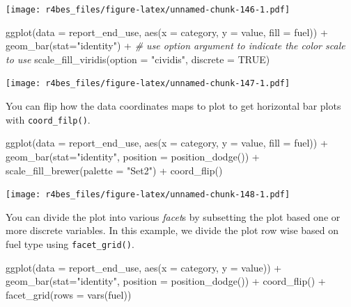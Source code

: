 \documentclass[
]{book}
\newenvironment{Shaded}{\begin{snugshade}}{\end{snugshade}}
\newcommand{\AttributeTok}[1]{\textcolor[rgb]{0.77,0.63,0.00}{#1}}
\newcommand{\CommentTok}[1]{\textcolor[rgb]{0.56,0.35,0.01}{\textit{#1}}}
\newcommand{\ConstantTok}[1]{\textcolor[rgb]{0.00,0.00,0.00}{#1}}
\newcommand{\FunctionTok}[1]{\textcolor[rgb]{0.00,0.00,0.00}{#1}}
\newcommand{\NormalTok}[1]{#1}
\newcommand{\SpecialCharTok}[1]{\textcolor[rgb]{0.00,0.00,0.00}{#1}}
\newcommand{\StringTok}[1]{\textcolor[rgb]{0.31,0.60,0.02}{#1}}
\begin{document}
\texttt{[image: r4bes\_files/figure-latex/unnamed-chunk-146-1.pdf]}

\begin{Shaded}
\begin{Highlighting}[]
\FunctionTok{ggplot}\NormalTok{(}\AttributeTok{data =}\NormalTok{ report\_end\_use, }\FunctionTok{aes}\NormalTok{(}\AttributeTok{x =}\NormalTok{ category, }\AttributeTok{y =}\NormalTok{ value, }\AttributeTok{fill =}\NormalTok{ fuel)) }\SpecialCharTok{+}
    \FunctionTok{geom\_bar}\NormalTok{(}\AttributeTok{stat=}\StringTok{"identity"}\NormalTok{) }\SpecialCharTok{+} 
    \CommentTok{\# use option argument to indicate the color scale to use}
    \FunctionTok{scale\_fill\_viridis}\NormalTok{(}\AttributeTok{option =} \StringTok{"cividis"}\NormalTok{,}
                       \AttributeTok{discrete =} \ConstantTok{TRUE}\NormalTok{) }
\end{Highlighting}
\end{Shaded}

\texttt{[image: r4bes\_files/figure-latex/unnamed-chunk-147-1.pdf]}

You can flip how the data coordinates maps to plot to get horizontal bar plots with \texttt{coord\_filp()}.

\begin{Shaded}
\begin{Highlighting}[]
\FunctionTok{ggplot}\NormalTok{(}\AttributeTok{data =}\NormalTok{ report\_end\_use, }\FunctionTok{aes}\NormalTok{(}\AttributeTok{x =}\NormalTok{ category, }\AttributeTok{y =}\NormalTok{ value, }\AttributeTok{fill =}\NormalTok{ fuel)) }\SpecialCharTok{+}
    \FunctionTok{geom\_bar}\NormalTok{(}\AttributeTok{stat=}\StringTok{"identity"}\NormalTok{, }\AttributeTok{position =} \FunctionTok{position\_dodge}\NormalTok{()) }\SpecialCharTok{+} 
    \FunctionTok{scale\_fill\_brewer}\NormalTok{(}\AttributeTok{palette =} \StringTok{"Set2"}\NormalTok{) }\SpecialCharTok{+}
    \FunctionTok{coord\_flip}\NormalTok{()}
\end{Highlighting}
\end{Shaded}

\texttt{[image: r4bes\_files/figure-latex/unnamed-chunk-148-1.pdf]}

You can divide the plot into various \emph{facet}s by subsetting the plot based one or more discrete variables. In this example, we divide the plot row wise based on fuel type using \texttt{facet\_grid()}.

\begin{Shaded}
\begin{Highlighting}[]
\FunctionTok{ggplot}\NormalTok{(}\AttributeTok{data =}\NormalTok{ report\_end\_use, }\FunctionTok{aes}\NormalTok{(}\AttributeTok{x =}\NormalTok{ category, }\AttributeTok{y =}\NormalTok{ value)) }\SpecialCharTok{+}
    \FunctionTok{geom\_bar}\NormalTok{(}\AttributeTok{stat=}\StringTok{"identity"}\NormalTok{, }\AttributeTok{position =} \FunctionTok{position\_dodge}\NormalTok{()) }\SpecialCharTok{+} 
    \FunctionTok{coord\_flip}\NormalTok{() }\SpecialCharTok{+}
    \FunctionTok{facet\_grid}\NormalTok{(}\AttributeTok{rows =} \FunctionTok{vars}\NormalTok{(fuel))}
\end{Highlighting}
\end{Shaded}
\end{document}
